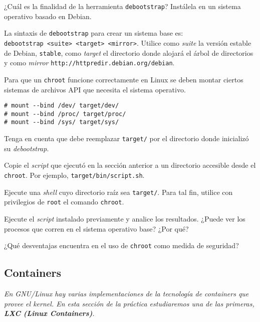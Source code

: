 \begin{questions}
  \question ¿Cuál es la finalidad de la herramienta \texttt{debootstrap}?
  Instálela en un sistema operativo basado en Debian.

  \question La sintaxis de \texttt{debootstrap} para crear un sistema base
  es: \texttt{debootstrap\ <suite>\ <target>\ <mirror>}. Utilice como
  \textit{suite} la versión estable de Debian, \texttt{stable}, como
  \textit{target} el directorio donde alojará el árbol de directorios y
  como \textit{mirror} \texttt{http://httpredir.debian.org/debian}.

  \question Para que un \texttt{chroot} funcione correctamente en Linux se
  deben montar ciertos sistemas de archivos API que necesita el sistema
  operativo.
\begin{verbatim}
# mount --bind /dev/ target/dev/
# mount --bind /proc/ target/proc/
# mount --bind /sys/ target/sys/
\end{verbatim}

  Tenga en cuenta que debe reemplazar \texttt{target/} por el directorio
  donde inicializó su \textit{debootstrap}.

  \question Copie el \textit{script} que ejecutó en la sección anterior a
  un directorio accesible desde el \texttt{chroot}. Por ejemplo,
  \texttt{target/bin/script.sh}.

  \question Ejecute una \textit{shell} cuyo directorio raíz sea
  \texttt{target/}. Para tal fin, utilice con privilegios de \texttt{root}
  el comando \texttt{chroot}.

  \question Ejecute el \textit{script} instalado previamente y analice los
  resultados. ¿Puede ver los procesos que corren en el sistema operativo
  base? ¿Por qué?

  \question ¿Qué desventajas encuentra en el uso de \texttt{chroot} como
  medida de seguridad?

\end{questions}

\subsection{Containers}

\textit{En GNU/Linux hay varias implementaciones de la tecnología de
  containers que provee el kernel. En esta sección de la práctica
  estudiaremos una de las primeras, \textbf{LXC (Linux Containers)}.}


